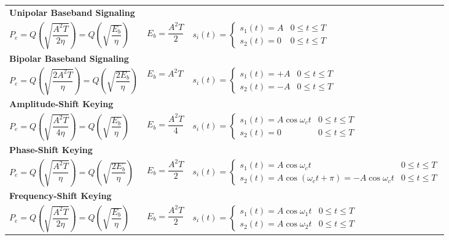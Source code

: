 \renewcommand{\arraystretch}{2.5}
	\begin{tabular}{ p{6cm} p{2.5cm} p{9cm} }		
		\multicolumn{3}{l}{\textbf{Unipolar Baseband Signaling}} \\
		$ P_e = Q\left(\sqrt{\dfrac{A^2 T}{2 \eta}}\right) = Q\left(\sqrt{\dfrac{E_b}{\eta}}\right) $
		& $ E_b = \dfrac{A^2 T}{2} $
		& $ s_i(t) = \begin{cases}
		     s_1(t) = A & 0 \leq t \leq T \\       
		     s_2(t) = 0 & 0 \leq t \leq T
		   \end{cases}$ \\  

		\multicolumn{3}{l}{\textbf{Bipolar Baseband Signaling}} \\
		$ P_e = Q\left(\sqrt{\dfrac{2 A^2 T}{\eta}}\right) = Q\left(\sqrt{\dfrac{2 E_b}{\eta}}\right) $
		& $ E_b = A^2 T $
		& $ s_i(t) = \begin{cases}
 		     s_1(t) = +A & 0 \leq t \leq T \\       
 		     s_2(t) = -A & 0 \leq t \leq T
 		   \end{cases} $ \\

		\multicolumn{3}{l}{\textbf{Amplitude-Shift Keying}} \\
		$ P_e = Q\left(\sqrt{\dfrac{A^2 T}{4 \eta}}\right) = Q\left(\sqrt{\dfrac{E_b}{\eta}}\right) $
		& $ E_b = \dfrac{A^2 T}{4} $
		& $ s_i(t) = \begin{cases}
 		     s_1(t) = A \cos{\omega_c t} & 0 \leq t \leq T \\       
 		     s_2(t) = 0 & 0 \leq t \leq T
 		   \end{cases} $ \\

		\multicolumn{3}{l}{\textbf{Phase-Shift Keying}} \\
		$ P_e = Q\left(\sqrt{\dfrac{A^2 T}{\eta}}\right) = Q\left(\sqrt{\dfrac{2 E_b}{\eta}}\right)  $
		& $ E_b = \dfrac{A^2 T}{2} $
		& $ s_i(t) = \begin{cases}
 		     s_1(t) = A \cos{\omega_c t} & 0 \leq t \leq T \\       
 		     s_2(t) = A \cos{(\omega_c t + \pi)} = - A \cos{\omega_c t} & 0 \leq t \leq T
 		   \end{cases} $ \\

		\multicolumn{3}{l}{\textbf{Frequency-Shift Keying}} \\
		$ P_e = Q\left(\sqrt{\dfrac{A^2 T}{2 \eta}}\right) = Q\left(\sqrt{\dfrac{E_b}{\eta}}\right) $
		& $ E_b = \dfrac{A^2 T}{2} $
		& $ s_i(t) = \begin{cases}
 		     s_1(t) = A \cos{\omega_1 t} & 0 \leq t \leq T \\       
 		     s_2(t) = A \cos{\omega_2 t} & 0 \leq t \leq T
 		   \end{cases}$ \\

 	\end{tabular}
	\renewcommand{\arraystretch}{\arraystretchOriginal}
